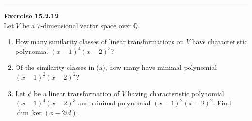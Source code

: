 \documentclass[a4paper, 12pt]{article}
\newenvironment{problem}[2][Exercise]
    { \begin{mdframed}[backgroundcolor=gray!20] \textbf{#1 #2} \\}
    {  \end{mdframed}}
\begin{document}
\noindent\rule{7in}{2.8pt}
\begin{problem}{15.2.12}
Let \(V\) be a 7-dimensional vector space over \(\mathbb{Q}\).
\begin{enumerate}[(1)]
\item How many similarity classes of linear transformations on \(V\) have characteristic polynomial \((x-1)^4(x-2)^3\)?
\item Of the similarity classes in (a), how many have minimal polynomial \((x-1)^2(x-2)^2\)?
\item Let \(\phi\) be a linear transformation of \(V\) having characteristic polynomial \((x-1)^4(x-2)^3\) and minimal polynomial 
\((x-1)^2(x-2)^2\). Find \(\dim \ker (\phi-2id)\). 
\end{enumerate}
\end{problem}
\end{document}
